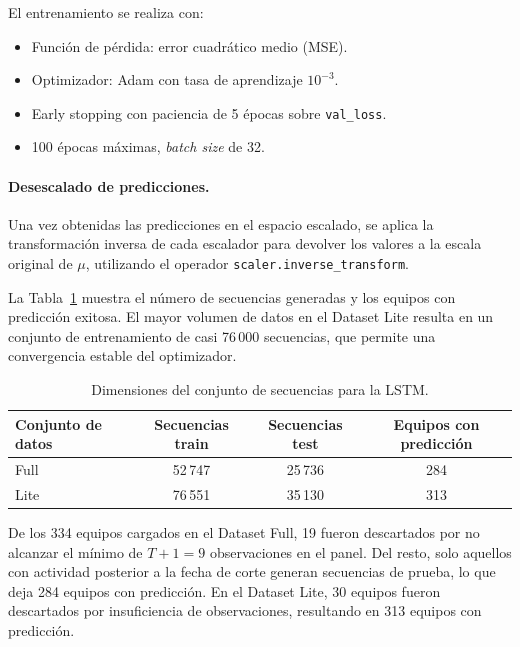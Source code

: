 El entrenamiento se realiza con:
\begin{itemize}
	\item Funci\'on de p\'erdida: error cuadr\'atico medio (MSE).
	\item Optimizador: Adam con tasa de aprendizaje \(10^{-3}\).
	\item Early stopping con paciencia de 5 \'epocas sobre \texttt{val\_loss}.
	\item 100 \'epocas m\'aximas, \textit{batch size} de 32.
\end{itemize}

\paragraph{Desescalado de predicciones.}
Una vez obtenidas las predicciones en el espacio escalado, se aplica la transformaci\'on inversa de cada escalador para devolver los valores a la escala original de \(\mu\), utilizando el operador \texttt{scaler.inverse\_transform}.

La Tabla~\ref{tab:lstm_dimensiones} muestra el n\'umero de secuencias generadas y los equipos con predicci\'on exitosa. El mayor volumen de datos en el Dataset Lite resulta en un conjunto de entrenamiento de casi 76\,000 secuencias, que permite una convergencia estable del optimizador.

\begin{table}[htbp]
	\centering
	\caption{Dimensiones del conjunto de secuencias para la LSTM.}
	\label{tab:lstm_dimensiones}
	\begin{tabular}{lccc}
		\toprule
		\textbf{Conjunto de datos} & \textbf{Secuencias train} & \textbf{Secuencias test} & \textbf{Equipos con predicci\'on} \\
		\midrule
		Full            & 52\,747 & 25\,736 & 284 \\
		Lite            & 76\,551 & 35\,130 & 313 \\
		\bottomrule
	\end{tabular}
\end{table}

De los 334 equipos cargados en el Dataset Full, 19 fueron descartados por no alcanzar el m\'inimo de \(T+1 = 9\) observaciones en el panel. Del resto, solo aquellos con actividad posterior a la fecha de corte generan secuencias de prueba, lo que deja 284 equipos con predicci\'on. En el Dataset Lite, 30 equipos fueron descartados por insuficiencia de observaciones, resultando en 313 equipos con predicci\'on.

